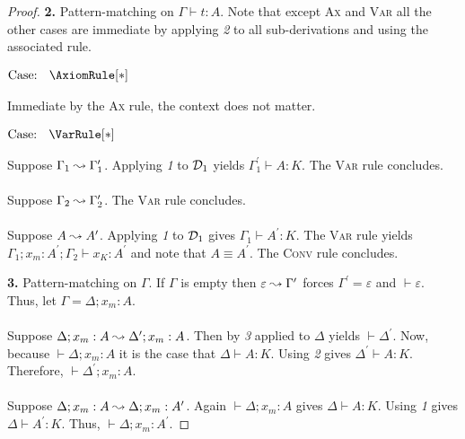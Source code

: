 \begin{proof}
    \noindent \textbf{2.} Pattern-matching on $\Gamma \vdash t : A$.
    Note that except \textsc{Ax} and \textsc{Var} all the other cases are immediate by applying \textit{2} to all sub-derivations and using the associated rule.

    $\text{Case: }\begin{array}{c} \AxiomRule[*] \end{array}$
    \begin{proofcase}
        Immediate by the \textsc{Ax} rule, the context does not matter.
    \end{proofcase}

    $\text{Case: }\begin{array}{c} \VarRule[*] \end{array}$
    \begin{proofcase}
        Suppose $\Gamma_1 \leadsto \Gamma_1^\prime$.
        Applying \textit{1} to $\mathcal{D}_{1}$ yields $\Gamma^\prime_1 \vdash A : K$.
        The \textsc{Var} rule concludes.
        \\ \\
        Suppose $\Gamma_2 \leadsto \Gamma_2^\prime$.
        The \textsc{Var} rule concludes.
        \\ \\
        Suppose $A \leadsto A^\prime$.
        Applying \textit{1} to $\mathcal{D}_{1}$ gives $\Gamma_1 \vdash A^\prime : K$.
        The \textsc{Var} rule yields $\Gamma_1; x_m : A^\prime; \Gamma_2 \vdash x_K : A^\prime$ and note that $A \equiv A^\prime$.
        The \textsc{Conv} rule concludes.
    \end{proofcase}

    \noindent \textbf{3.} Pattern-matching on $\Gamma$.
    If $\Gamma$ is empty then $\varepsilon \leadsto \Gamma^\prime$ forces $\Gamma^\prime = \varepsilon$ and $\vdash \varepsilon$.
    Thus, let $\Gamma = \Delta; x_m : A$.
    \\ \\
    Suppose $\Delta; x_m : A \leadsto \Delta^\prime; x_m : A$.
    Then by \textit{3} applied to $\Delta$ yields $\vdash \Delta^\prime$.
    Now, because $\vdash \Delta; x_m : A$ it is the case that $\Delta \vdash A : K$.
    Using \textit{2} gives $\Delta^\prime \vdash A : K$.
    Therefore, $\vdash \Delta^\prime; x_m : A$.
    \\ \\
    Suppose $\Delta; x_m : A \leadsto \Delta; x_m : A^\prime$.
    Again $\vdash \Delta; x_m : A$ gives $\Delta \vdash A : K$.
    Using \textit{1} gives $\Delta \vdash A^\prime : K$.
    Thus, $\vdash \Delta; x_m : A^\prime$.
\end{proof}

